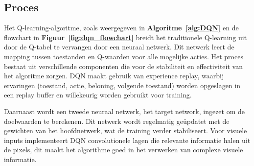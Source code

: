 \documentclass[a4paper,12pt]{report}
\begin{document}
\subsection{Proces}
Het Q-learning-algoritme, zoals weergegeven in \textbf{Algoritme~\ref{alg:DQN}}
en de flowchart in \textbf{Figuur~\ref{fig:dqn_flowchart}} breidt het
traditionele Q-learning uit door de Q-tabel te vervangen door een neuraal
netwerk. Dit netwerk leert de mapping tussen toestanden en Q-waarden voor alle
mogelijke acties. Het proces bestaat uit verschillende componenten die voor de
stabiliteit en effectiviteit van het algoritme zorgen. DQN maakt gebruik van
experience replay, waarbij ervaringen (toestand, actie, beloning, volgende
toestand) worden opgeslagen in een replay buffer en willekeurig worden gebruikt
voor training.

Daarnaast wordt een tweede neuraal netwerk, het target network, ingezet om de
doelwaarden te berekenen. Dit netwerk wordt regelmatig geüpdatet met de
gewichten van het hoofdnetwerk, wat de training verder stabiliseert. Voor
visuele inputs implementeert DQN convolutionele lagen die relevante informatie
halen uit de pixels, dit maakt het algorithme goed in het verwerken van
complexe visuele informatie.
\end{document}

